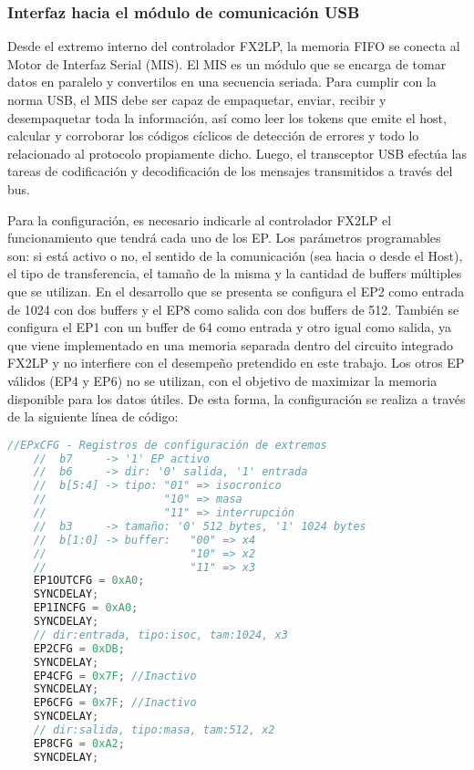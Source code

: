 	
\subsubsection{Interfaz hacia el módulo de comunicación USB}
	Desde el extremo interno del controlador FX2LP, la memoria FIFO se conecta al Motor de Interfaz Serial (MIS). El MIS es un módulo que se encarga de tomar datos en paralelo y convertilos en una secuencia seriada. Para cumplir con la norma USB, el MIS debe ser capaz de empaquetar, enviar, recibir y desempaquetar toda la información, así como leer los tokens que emite el host, calcular y corroborar los códigos cíclicos de detección de errores y todo lo relacionado al protocolo propiamente dicho. Luego, el transceptor USB efectúa las tareas de codificación y decodificación de los mensajes transmitidos a través del bus.
	
	Para la configuración, es necesario indicarle al controlador FX2LP el funcionamiento que tendrá cada uno de los EP. Los parámetros programables son: si está activo o no, el sentido de la comunicación (sea hacia o desde el Host), el tipo de transferencia, el tamaño de la misma y la cantidad de buffers múltiples que se utilizan. En el desarrollo que se presenta se configura el EP2 como entrada de \SI{1024}{\byte} con dos buffers y el EP8 como salida con dos buffers de \SI{512}{\byte}. También se configura el EP1 con un buffer de \SI{64}{\byte} como entrada y otro igual como salida, ya que viene implementado en una memoria separada dentro del circuito integrado FX2LP y no interfiere con el desempeño pretendido en este trabajo. Los otros EP válidos (EP4 y EP6) no se utilizan, con el objetivo de maximizar la memoria disponible para los datos útiles. De esta forma, la configuración se realiza a través de la siguiente línea de código:
	
	\begin{lstlisting}[language=C,backgroundcolor=\color{gray!30}]
	//EPxCFG - Registros de configuración de extremos
	//	b7 	   -> '1' EP activo
	//	b6 	   -> dir: '0' salida, '1' entrada
	//	b[5:4] -> tipo: "01" => isocronico
	//					"10" => masa
	//					"11" => interrupción
	//	b3 	   -> tamaño: '0' 512 bytes, '1' 1024 bytes
	//	b[1:0] -> buffer: 	"00" => x4
	//						"10" => x2
	//						"11" => x3
	EP1OUTCFG = 0xA0;
	SYNCDELAY;
	EP1INCFG = 0xA0;
	SYNCDELAY;
	// dir:entrada, tipo:isoc, tam:1024, x3
	EP2CFG = 0xDB;
	SYNCDELAY;
	EP4CFG = 0x7F; //Inactivo
	SYNCDELAY;
	EP6CFG = 0x7F; //Inactivo
	SYNCDELAY;
	// dir:salida, tipo:masa, tam:512, x2
	EP8CFG = 0xA2; 
	SYNCDELAY;
	\end{lstlisting}
	
